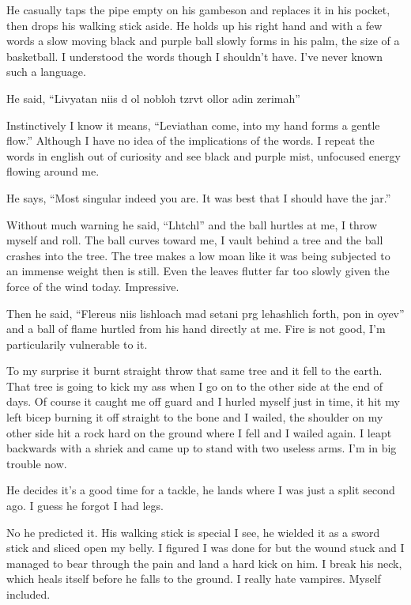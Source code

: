 He casually taps the pipe empty on his gambeson and replaces it in his pocket, then drops his walking stick aside. He holds up his right hand and with a few words a slow moving black and purple ball slowly forms in his palm, the size of a basketball. I understood the words though I shouldn't have. I've never known such a language.

He said, ``Livyatan niis d ol nobloh tzrvt ollor adin zerimah''

Instinctively I know it means, ``Leviathan come, into my hand forms a gentle flow.'' Although I have no idea of the implications of the words. I repeat the words in english out of curiosity and see black and purple mist, unfocused energy flowing around me.

He says, ``Most singular indeed you are. It was best that I should have the jar.''

Without much warning he said, ``Lhtchl'' and the ball hurtles at me, I throw myself and roll. The ball curves toward me, I vault behind a tree and the ball crashes into the tree. The tree makes a low moan like it was being subjected to an immense weight then is still. Even the leaves flutter far too slowly given the force of the wind today. Impressive.

Then he said, ``Flereus niis lishloach mad setani prg lehashlich forth, pon in oyev'' and a ball of flame hurtled from his hand directly at me. Fire is not good, I'm particularily vulnerable to it.

To my surprise it burnt straight throw that same tree and it fell to the earth. That tree is going to kick my ass when I go on to the other side at the end of days. Of course it caught me off guard and I hurled myself just in time, it hit my left bicep burning it off straight to the bone and I wailed, the shoulder on my other side hit a rock hard on the ground where I fell and I wailed again. I leapt backwards with a shriek and came up to stand with two useless arms. I'm in big trouble now.

He decides it's a good time for a tackle, he lands where I was just a split second ago. I guess he forgot I had legs.

No he predicted it. His walking stick is special I see, he wielded it as a sword stick and sliced open my belly. I figured I was done for but the wound stuck and I managed to bear through the pain and land a hard kick on him. I break his neck, which heals itself before he falls to the ground. I really hate vampires. Myself included.

